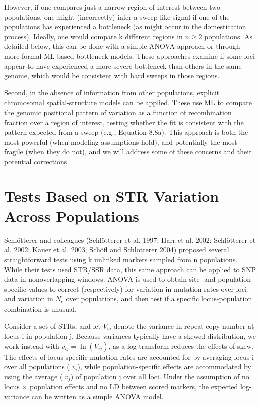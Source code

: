 \documentclass{article}
\begin{document}
However, if one compares just a narrow region of interest between two populations, one might (incorrectly) infer a sweep-like signal if one of the populations has experienced a bottleneck (as might occur in the domestication process). Ideally, one would compare k different regions in  $ n \geq 2 $ populations. As detailed below, this can be done with a simple ANOVA approach or through more formal ML-based bottleneck models. These approaches examine if some loci appear to have experienced a more severe bottleneck than others in the same genome, which would be consistent with hard sweeps in those regions.

Second, in the absence of information from other populations, explicit chromosomal spatial-structure models can be applied. These use ML to compare the genomic positional pattern of variation as a function of recombination fraction over a region of interest, testing whether the fit is consistent with the pattern expected from a sweep (e.g., Equation 8.8a). This approach is both the most powerful (when modeling assumptions hold), and potentially the most fragile (when they do not), and we will address some of these concerns and their potential corrections.

\section{Tests Based on STR Variation Across Populations}
Schlötterer and colleagues (Schlötterer et al. 1997; Harr et al. 2002; Schlötterer et al. 2002; Kauer et al. 2003; Schöfl and Schlötterer 2004) proposed several straightforward tests using k unlinked markers sampled from n populations. While their tests used STR/SSR data, this same approach can be applied to SNP data in nonoverlapping windows. ANOVA is used to obtain site- and population-specific values to correct (respectively) for variation in mutation rates over loci and variation in  $ N_{e} $ over populations, and then test if a specific locus-population combination is unusual.

Consider a set of STRs, and let  $ V_{ij} $ denote the variance in repeat copy number at locus i in population j. Because variances typically have a skewed distribution, we work instead with  $ v_{ij} = \ln(V_{ij}) $, as a log transform reduces the effects of skew. The effects of locus-specific mutation rates are accounted for by averaging locus i over all populations ( $ v_i $), while population-specific effects are accommodated by using the average ( $ v_j $) of population j over all loci. Under the assumption of no locus  $ \times $ population effects and no LD between scored markers, the expected log-variance can be written as a simple ANOVA model.
\end{document}
